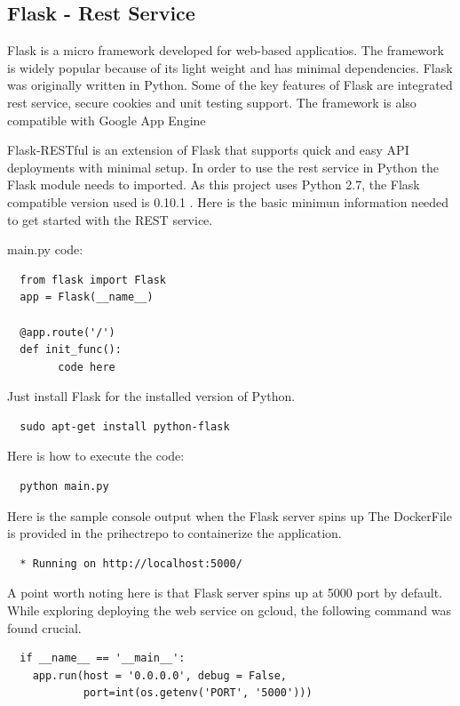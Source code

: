 \subsection{Flask - Rest Service}
Flask is a micro framework developed for web-based applicatios. The framework
is widely popular because of its light weight and has minimal dependencies.
Flask was originally written in Python. Some of the key features of Flask are
integrated rest service, secure cookies and unit testing support. The
framework is also compatible with Google App
Engine~\cite{hid-sp18-417-google_appengine}

Flask-RESTful is an extension of Flask that supports quick and easy API
deployments with minimal setup. In order to use the rest service in Python the
Flask module needs to imported. As this project uses Python 2.7, the Flask
compatible version used is 0.10.1 . Here is the basic minimun information
needed to get started with the REST service.

main.py code:

\begin{verbatim}
  from flask import Flask
  app = Flask(__name__)

  @app.route('/')
  def init_func():
        code here
\end{verbatim}

Just install Flask for the installed version of Python.

\begin{verbatim}
  sudo apt-get install python-flask
\end{verbatim}

Here is how to execute the code:
\begin{verbatim}
  python main.py
\end{verbatim}

Here is the sample console output when the Flask server spins up The
DockerFile is provided in the prihectrepo to containerize the application. 
\begin{verbatim}
  * Running on http://localhost:5000/
\end{verbatim}
A point worth noting here is that Flask server spins up at 5000 port by
default. While exploring deploying the web service on gcloud, the following
command was found crucial.

\begin{verbatim}
  if __name__ == '__main__':
    app.run(host = '0.0.0.0', debug = False, 
            port=int(os.getenv('PORT', '5000')))
\end{verbatim}

